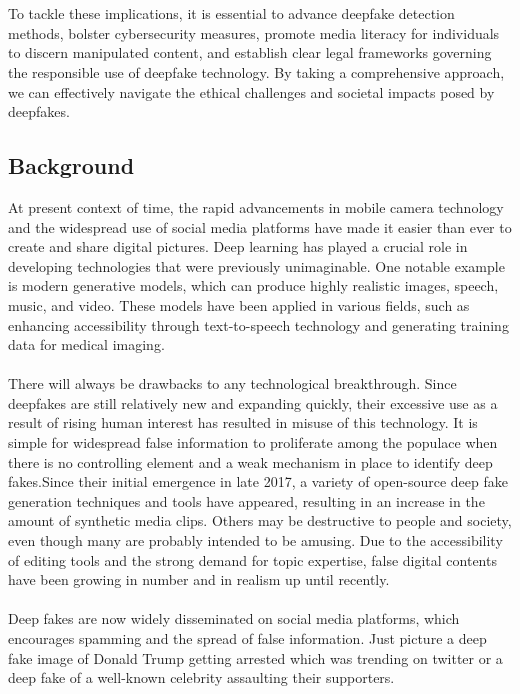 \documentclass[12 pt]{article}
\begin{document}
\\\\
To tackle these implications, it is essential to advance deepfake detection methods, bolster cybersecurity measures, promote media literacy for individuals to discern manipulated content, and establish clear legal frameworks governing the responsible use of deepfake technology. By taking a comprehensive approach, we can effectively navigate the ethical challenges and societal impacts posed by deepfakes.


\subsection{Background}
At present context of time, the rapid advancements in mobile camera technology and the widespread use of social media platforms have made it easier than ever to create and share digital pictures. Deep learning has played a crucial role in developing technologies that were previously unimaginable. One notable example is modern generative models, which can produce highly realistic images, speech, music, and video. These models have been applied in various fields, such as enhancing accessibility through text-to-speech technology and generating training data for medical imaging.
\\
\\
There will always be drawbacks to any technological breakthrough. Since deepfakes are still relatively new and expanding quickly, their excessive use as a result of rising human interest has resulted in misuse of this technology. It is simple for widespread false information to proliferate among the populace when there is no controlling element and a weak mechanism in place to identify deep fakes.Since their initial emergence in late 2017, a variety of open-source deep fake generation techniques and tools have appeared, resulting in an increase in the amount of synthetic media clips. Others may be destructive to people and society, even though many are probably intended to be amusing. Due to the accessibility of editing tools and the strong demand for topic expertise, false digital contents have been growing in number and in realism up until recently.
\\
\\
Deep fakes are now widely disseminated on social media platforms, which encourages spamming and the spread of false information. Just picture a deep fake image of Donald Trump getting arrested which was trending on twitter or a deep fake of a well-known celebrity assaulting their supporters.
\end{document}

